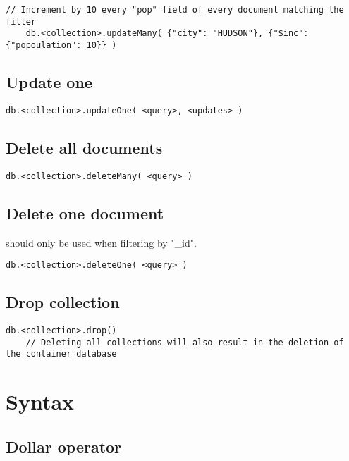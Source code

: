 \documentclass[a4paper]{article}
\begin{document}
\begin{lstlisting}[style=js]
    // Increment by 10 every "pop" field of every document matching the filter
    db.<collection>.updateMany( {"city": "HUDSON"}, {"$inc": {"popoulation": 10}} )
\end{lstlisting}

\subsection{Update one}

\begin{lstlisting}[style=js]
    db.<collection>.updateOne( <query>, <updates> )
\end{lstlisting}

\subsection{Delete all documents}

\begin{lstlisting}[style=js]
    db.<collection>.deleteMany( <query> )
\end{lstlisting}

\subsection{Delete one document}

should only be used when filtering by "\_id".

\begin{lstlisting}[style=js]
    db.<collection>.deleteOne( <query> )
\end{lstlisting}

\subsection{Drop collection}

\begin{lstlisting}[style=js]
    db.<collection>.drop()
    // Deleting all collections will also result in the deletion of the container database
\end{lstlisting}

\section{Syntax}

\subsection{Dollar operator}
\end{document}
